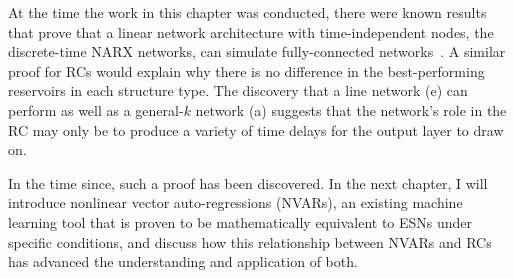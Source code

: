 At the time the work in this chapter was conducted, there were known
results that prove that a linear network architecture with
time-independent nodes, the discrete-time NARX networks, can simulate
fully-connected networks~\cite{siegelmann1997}. A similar proof for RCs
would explain why there is no difference in the best-performing
reservoirs in each structure type. The discovery that a line network
(e) can perform as well as a general-$k$ network (a) suggests that the
network's role in the RC may only be to produce a variety of time
delays for the output layer to draw on.

In the time since, such a proof has been discovered. In the next
chapter, I will introduce nonlinear vector auto-regressions (NVARs),
an existing machine learning tool that is proven to be mathematically
equivalent to ESNs under specific conditions, and discuss how this
relationship between NVARs and RCs has advanced the understanding and
application of both.
